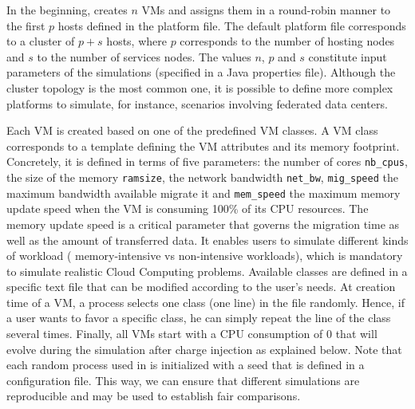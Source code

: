 In the beginning, \vmps creates $n$ VMs and assigns them in a
round-robin manner to the first $p$ hosts defined in the platform
file.  The default platform file corresponds to a cluster of $p+s$
hosts, where $p$ corresponds to the number of hosting nodes and $s$ to
the number of services nodes. The values $n$, $p$ and $s$ constitute
input parameters of the simulations (specified in a Java properties
file).
Although the cluster topology is the most
common one, it is possible to define more complex platforms to simulate,
for instance, scenarios involving federated data centers.

Each VM is created based on one of the predefined VM classes. A VM
class corresponds to a template defining the VM attributes and its
memory footprint. Concretely, it is
defined in terms of five parameters: the number of cores
\texttt{nb\_cpus}, the size of the memory \texttt{ramsize}, the
network bandwidth \texttt{net\_bw}, \texttt{mig\_speed} the maximum
bandwidth available migrate it and \texttt{mem\_speed} the maximum
memory update speed when the VM is consuming 100\% of its CPU
resources. The memory update speed is a critical parameter that
governs the migration time as well as the amount of transferred
data. It enables users to simulate different kinds of workload (\ie
memory-intensive vs non-intensive workloads), which is mandatory to
simulate realistic Cloud Computing problems.  Available classes are
defined in a specific text file that can be modified according to the
user's needs.    At creation time
of a VM, a process selects one class (\ie one line) in the file
randomly. Hence, if a user wants to favor a specific class, he can
simply repeat the line of the class several times. Finally, all VMs
start with a CPU consumption of 0 that will evolve during the
simulation after charge injection as explained below.  Note that each
random process used in \vmps is initialized with a seed that is
defined in a configuration file. This way, we can ensure that
different simulations are reproducible and may be used to establish
fair comparisons.

